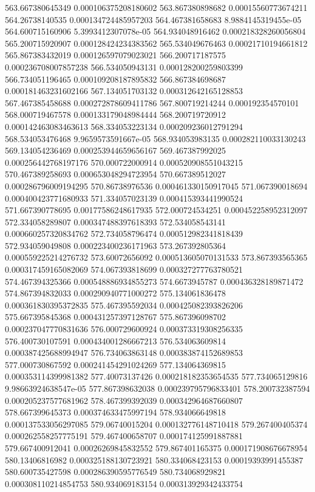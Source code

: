 {563.667380645349 0.000106375208180602
563.867380898682 0.00015560773674211
564.26738140535 0.000134724485957203
564.467381658683 8.9884145319455e-05
564.600715160906 5.3993412307078e-05
564.934048916462 0.000218328260056804
565.200715920907 0.000128424234383562
565.534049676463 0.00021710194661812
565.867383432019 0.000126597079023021
566.200717187575 0.000236708007857238
566.534050943131 0.000128200259803399
566.734051196465 0.000109208187895832
566.867384698687 0.000181463231602166
567.134051703132 0.000312642165128853
567.467385458688 0.000272878609411786
567.800719214244 0.000192354570101
568.000719467578 0.000133179048984444
568.200719720912 0.000142463083463613
568.334053223134 0.000209236012791294
568.534053476468 9.9659573591667e-05
568.934053983135 0.000282110033130243
569.134054236469 0.000253944659656167
569.467387992025 0.000256442768197176
570.000722000914 0.000520908551043215
570.467389258693 0.000653048294723954
570.667389512027 0.000286796009194295
570.86738976536 0.000461330150917045
571.067390018694 0.000400423771680933
571.334057023139 0.000415393441990524
571.667390778695 0.00177586248617935
572.000724534251 0.000452258952312097
572.334058289807 0.000347488397618393
572.534058543141 0.000660257320834762
572.734058796474 0.000512982341818439
572.934059049808 0.000223400236171963
573.267392805364 0.000559225214276732
573.60072656092 0.000513605070131533
573.867393565365 0.000317459165082069
574.067393818699 0.000327277763780521
574.467394325366 0.000548886934855273
574.6673945787 0.000436328189871472
574.867394832033 0.000290940771000272
575.134061836478 0.000361830395372835
575.467395592034 0.000425082393826206
575.667395845368 0.000431257397128767
575.867396098702 0.000237047770831636
576.000729600924 0.000373319308256335
576.400730107591 0.000434001286667213
576.534063609814 0.000387425688994947
576.734063863148 0.000383874152689853
577.000730867592 0.000241454291024269
577.134064369815 0.000353114399981382
577.40073137426 0.000218182353654535
577.734065129816 9.98663924638547e-05
577.867398632038 0.000239795796833401
578.200732387594 0.000205237577681962
578.467399392039 0.000342964687660807
578.667399645373 0.000374633475997194
578.934066649818 0.000137533056297085
579.06740015204 0.000132776148710418
579.267400405374 0.000262558257775191
579.467400658707 0.000174125991887881
579.667400912041 0.00026269845832552
579.867401165375 0.000171908676678954
580.13406816982 0.000325188130723921
580.334068423153 0.00019393991455387
580.600735427598 0.000286390595776549
580.734068929821 0.000308110214854753
580.934069183154 0.000313929342433754
}
